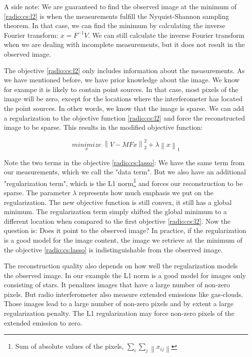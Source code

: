 A side note: We are guaranteed to find the observed image at the minimum of \eqref{radio:cs:l2} is when the measurements fulfill the Nyquist-Shannon sampling theorem. In that case, we can find the minimum by calculating the inverse Fourier transform: $x = F^{-1}V$. We can still calculate the inverse Fourier transform when we are dealing with incomplete measurements, but it does not result in the observed image.

The objective \eqref{radio:cs:l2} only includes information about the measurements. As we have mentioned before, we have prior knowledge about the image. We know for exampe it is likely to contain point sources. In that case, most pixels of the image will be zero, except for the locations where the interferometer has located the point sources. In other words, we know that the image is sparse. We can add a regularization to the objective function \eqref{radio:cs:l2} and force the reconstructed image to be sparse. This results in the modified objective function:

\begin{equation}\label{radio:cs:lasso}
\underset{x}{minimize} \: \left \| V - MFx \right \|_2^2 + \lambda \left \| x \right \|_1
\end{equation}

Note the two terms in the objective \eqref{radio:cs:lasso}: We have the same term from our measurements, which we call the "data term". But we also have an additional "regularization term", which is the L1 norm\footnote{Sum of absolute values of the pixels, $\sum_i \sum_j \left \| x_{ij} \right \|$} and forces our reconstruction to be sparse. The parameter $\lambda$ represents how much emphasis we put on the regularization. The new objective function is still convex, it still has a global minimum. The regularization term simply shifted the global minimum to a different location when compared to the first objective \eqref{radio:cs:l2}. Now the question is: Does it point to the observed image? In practice, if the regularization is a good model for the image content, the image we retrieve at the minimum of the objective \eqref{radio:cs:lasso} is indistinguishable from the observed image.

The reconstruction quality also depends on how well the regularization models the observed image. In our example the L1 norm is a good model for images only consisting of stars. It penalizes images that have a large number of non-zero pixels. But radio interferometer also measure extended emissions like gas-clouds. Those images lead to a large number of non-zero pixels and by extent a large regularization penalty. The L1 regularization may force non-zero pixels of the extended emission to zero.

